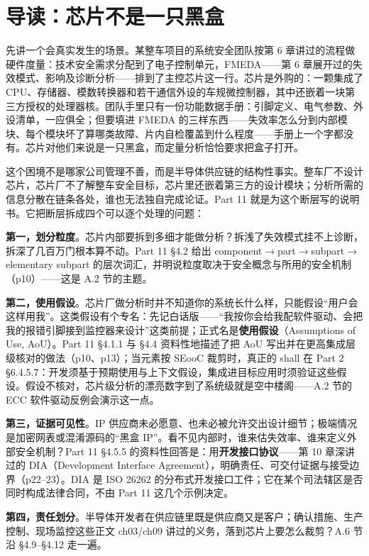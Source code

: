 \section{导读：芯片不是一只黑盒}

先讲一个会真实发生的场景。某整车项目的系统安全团队按第 6 章讲过的流程做硬件度量：技术安全需求分配到了电子控制单元，FMEDA——第 6 章展开过的失效模式、影响及诊断分析——排到了主控芯片这一行。芯片是外购的：一颗集成了 CPU、存储器、模数转换器和若干通信外设的车规微控制器，其中还嵌着一块第三方授权的处理器核。团队手里只有一份功能数据手册：引脚定义、电气参数、外设清单，一应俱全；但要填进 FMEDA 的三样东西——失效率怎么分到内部模块、每个模块坏了算哪类故障、片内自检覆盖到什么程度——手册上一个字都没有。芯片对他们来说是一只黑盒，而定量分析恰恰要求把盒子打开。

这个困境不是哪家公司管理不善，而是半导体供应链的结构性事实。整车厂不设计芯片，芯片厂不了解整车安全目标，芯片里还嵌着第三方的设计模块；分析所需的信息分散在链条各处，谁也无法独自完成论证。Part 11 就是为这个断层写的说明书。它把断层拆成四个可以逐个处理的问题：

\textbf{第一，划分粒度}。芯片内部要拆到多细才能做分析？拆浅了失效模式挂不上诊断，拆深了几百万门根本算不动。Part 11 §4.2 给出 component\(\rightarrow\)part\(\rightarrow\)subpart\(\rightarrow\)elementary subpart 的层次词汇，并明说粒度取决于安全概念与所用的安全机制（p10）——这是 A.2 节的主题。

\textbf{第二，使用假设}。芯片厂做分析时并不知道你的系统长什么样，只能假设“用户会这样用我”。这类假设有个专名：先记白话版——“我按你会给我配软件驱动、会把我的报错引脚接到监控器来设计”这类前提；正式名是\textbf{使用假设}（Assumptions of Use, AoU）。Part 11 §4.1.1 与 §4.4 资料性地描述了把 AoU 写出并在更高集成层级核对的做法（p10、p13）；当元素按 SEooC 裁剪时，真正的 shall 在 Part 2 §6.4.5.7：开发须基于预期使用与上下文假设，集成进目标应用时须验证这些假设。假设不核对，芯片级分析的漂亮数字到了系统级就是空中楼阁——A.2 节的 ECC 软件驱动反例会演示这一点。

\textbf{第三，证据可见性}。IP 供应商未必愿意、也未必被允许交出设计细节；极端情况是加密网表或混淆源码的“黑盒 IP”。看不见内部时，谁来估失效率、谁来定义外部安全机制？Part 11 §4.5.5 的资料性回答是：用\textbf{开发接口协议}——第 10 章深讲过的 DIA（Development Interface Agreement），明确责任、可交付证据与接受边界（p22–23）。DIA 是 ISO 26262 的分布式开发接口工件；它在某个司法辖区是否同时构成法律合同，不由 Part 11 这几个示例决定。

\textbf{第四，责任划分}。半导体开发者在供应链里既是供应商又是客户；确认措施、生产控制、现场监控这些正文 ch03/ch09 讲过的义务，落到芯片上要怎么裁剪？A.6 节沿 §4.9–§4.12 走一遍。


